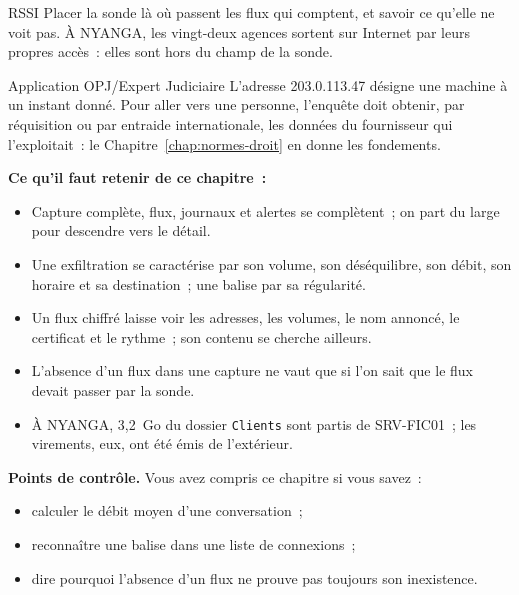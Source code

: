 \begin{boxmetier}{RSSI}
Placer la sonde là où passent les flux qui comptent, et savoir ce qu'elle
ne voit pas. À NYANGA, les vingt-deux agences sortent sur Internet par leurs
propres accès~: elles sont hors du champ de la sonde.
\end{boxmetier}

\begin{boxmetier}{Application OPJ/Expert Judiciaire}
L'adresse 203.0.113.47 désigne une machine à un instant donné. Pour aller
vers une personne, l'enquête doit obtenir, par réquisition ou par entraide
internationale, les données du fournisseur qui l'exploitait~: le
Chapitre~\ref{chap:normes-droit} en donne les fondements.
\end{boxmetier}

\separateur

\begin{boxresume}
\textbf{Ce qu'il faut retenir de ce chapitre~:}
\begin{itemize}
    \item Capture complète, flux, journaux et alertes se complètent~; on
          part du large pour descendre vers le détail.
    \item Une exfiltration se caractérise par son volume, son déséquilibre,
          son débit, son horaire et sa destination~; une balise par sa
          régularité.
    \item Un flux chiffré laisse voir les adresses, les volumes, le nom
          annoncé, le certificat et le rythme~; son contenu se cherche
          ailleurs.
    \item L'absence d'un flux dans une capture ne vaut \NON{} que si l'on
          sait que le flux devait passer par la sonde.
    \item À NYANGA, 3,2~Go du dossier \texttt{Clients} sont partis de
          SRV-FIC01~; les virements, eux, ont été émis de l'extérieur.
\end{itemize}
\end{boxresume}

\begin{boxinfo}
\textbf{Points de contrôle.} Vous avez compris ce chapitre si vous savez~:
\begin{itemize}
    \item calculer le débit moyen d'une conversation~;
    \item reconnaître une balise dans une liste de connexions~;
    \item dire pourquoi l'absence d'un flux ne prouve pas toujours son
          inexistence.
\end{itemize}
\end{boxinfo}

